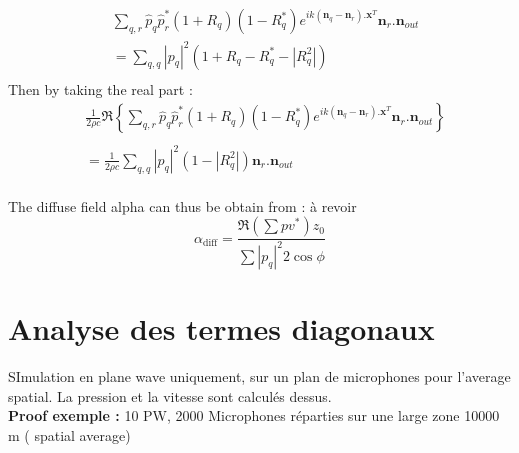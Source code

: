 \documentclass[
a4paper, %
12pt, %
]{SourcesTemplate/TemplateReport}
\begin{document}
\begin{equation}
	\begin{split}
		&\sum_{q, r}  \hat{p}_q  \hat{p}_r^*(1+R_q)(1-R_q^*) e^{ik(\mathbf{n}_q-\mathbf{n}_r).\mathbf{x}^T} \mathbf{n}_r.\mathbf{n}_{out} \\
		&= \sum_{q, q} \left|p_q\right|^2  (1+R_q - R_q^*-\left|R_q^2\right|) \\
	\end{split}
\end{equation}
Then by taking the real part :
\begin{equation}
		\begin{split}
		&	\frac{1}{2\rho c}\Re \left\{  \sum_{q, r}  \hat{p}_q  \hat{p}_r^*(1+R_q)(1-R_q^*) e^{ik(\mathbf{n}_q-\mathbf{n}_r).\mathbf{x}^T} \mathbf{n}_r.\mathbf{n}_{out}\right\} \\ \\
		&=	\frac{1}{2\rho c} \sum_{q, q} \left|p_q\right|^2  (1-\left|R_q^2\right|) \mathbf{n}_r.\mathbf{n}_{out} \\
	\end{split}	
\end{equation}

The diffuse field alpha can thus be obtain from : à revoir
\begin{equation}
\alpha_\text{diff} = \frac{{\Re}\left(\sum pv^*\right) z_0}{\sum\left|p_q\right|^2 2 \cos \phi}
\end{equation}

\section{Analyse des termes diagonaux}
SImulation en plane wave uniquement, sur un plan de microphones pour l'average spatial. La pression et la vitesse sont calculés dessus. \\
\textbf{Proof exemple : }10 PW, 2000 Microphones réparties sur une large zone 10000 m ( spatial average)\\
\end{document}

